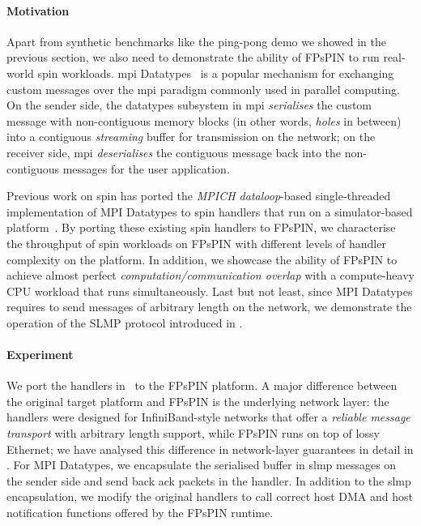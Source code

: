 \paragraph{Motivation} Apart from synthetic benchmarks like the ping-pong demo we showed in the previous section, we also need to demonstrate the ability of FPsPIN to run real-world \ac{spin} workloads.  \Ac{mpi} Datatypes~\cite{pierce_types_2002} is a popular mechanism for exchanging custom messages over the \ac{mpi} paradigm commonly used in parallel computing.  On the sender side, the datatypes subsystem in \ac{mpi} \emph{serialises} the custom message with non-contiguous memory blocks (in other words, \emph{holes} in between) into a contiguous \emph{streaming} buffer for transmission on the network; on the receiver side, \ac{mpi} \emph{deserialises} the contiguous message back into the non-contiguous messages for the user application.

Previous work on \ac{spin} has ported the \emph{MPICH dataloop}-based single-threaded implementation of MPI Datatypes to \ac{spin} handlers that run on a simulator-based platform~\cite{di_girolamo_network-accelerated_2019}.  By porting these existing \ac{spin} handlers to FPsPIN, we characterise the throughput of \ac{spin} workloads on FPsPIN with different levels of handler complexity on the platform.  In addition, we showcase the ability of FPsPIN to achieve almost perfect \emph{computation/communication overlap} with a compute-heavy CPU workload that runs simultaneously.  Last but not least, since MPI Datatypes requires to send messages of arbitrary length on the network, we demonstrate the operation of the SLMP protocol introduced in .

\paragraph{Experiment} We port the handlers in~\cite{di_girolamo_network-accelerated_2019} to the FPsPIN platform.
A major difference between the original target platform and FPsPIN is the underlying network layer: the handlers were designed for InfiniBand-style networks that offer a \emph{reliable message transport} with arbitrary length support, while FPsPIN runs on top of lossy Ethernet; we have analysed this difference in network-layer guarantees in detail in .  For MPI Datatypes, we encapsulate the serialised buffer in \ac{slmp} messages on the sender side and send back \ac{ack} packets in the handler.  In addition to the \ac{slmp} encapsulation, we modify the original handlers to call correct host DMA and host notification functions offered by the FPsPIN runtime. 

